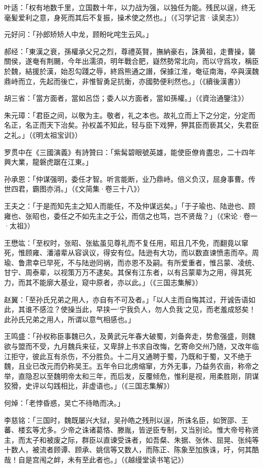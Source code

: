 叶适：「权有地数千里，立国数十年，以力战为强，以独任为能。残民以逞，终无毫髪爱利之意，身死而其后不复振，操术使之然也。」（《习学记言·读吴志》）

元好问：「孙郎矫矫人中龙，顾盼叱咤生云风。」

郝经：「東漢之衰，孫權承父兄之烈，尊禮英賢，撫納豪右，誅黄祖，走曹操，襲關侯，遂奄有荆颺，今年出濡須，明年戰合肥，嶷然勢常北向，而以守爲攻，稱臣於魏，結援於漢，始忍勾踐之辱，終爲熊通之譖，保據江淮，奄征南海，卒與漢魏鼎峙而立，先起而後亡，非惟智勇足抗衡，亦國勢便利然也。」（《續後漢書》）

胡三省：「當方面者，當如呂岱；委人以方面者，當如孫權。」（《資治通鑒注》）

朱元璋：「君臣之间，以敬为主。敬者，礼之本也。故礼立而上下之分定，分定而名正，名正而天下治矣。孙权盖不知此，轻与臣下戏狎，狎其臣而亵其父，失君臣之礼。」（《明太祖宝训》）

罗贯中在《三國演義》有詩贊曰：「紫髯碧眼號英雄，能使臣僚肯盡忠，二十四年興大業，龍磐虎踞在江東。」

孙承恩：「仲谋强明，委任才智。听言能断，业乃鼎峙。倍义负汉，屈身事曹。传世四君，霸图亦消。」（《文简集·卷三十八》）

王夫之：「于是而知先主之知人而能任，不及仲谋远矣。」「于子瑜也、陆逊也、顾雍也、张昭也，委任之不如先主之于公，而信之也笃，岂不贤哉？」（《宋论·卷一·太祖》）

王懋竑：「至权时，张昭、张紘虽见尊礼而不复任用，昭且几不免，而翻竟以窜死，惟顾雍、潘濬辈从容讽议，得安有位。陆逊有大功，而以数直谏愤恚而卒。周瑜、鲁肃幸已早死，不与陆逊同祸，而亦恩不及嗣。有所爱重者，惟吕蒙、凌统、甘宁、周泰辈，以视策万万不逮矣。其保有江东者，以有吕蒙辈为之用，得其死力，而其不能廓大基业，窥中原者，亦以此。」（《三国志集解》）

赵翼：「至孙氏兄弟之用人，亦自有不可及者。」「以人主而自悔其过，开诚告语如此，其谁不感泣？使操当此，早挟一‘宁我负人，勿人负我’之见，而老羞成怒矣！此孙氏兄弟之用人，所谓以意气相感也。」

王鸣盛：「孙权称臣事魏已久，及黄武元年春大破蜀，刘备奔走，势愈强盛，则魏欲与盟而不受，九月魏兵来征，又卑辞上书求自改悔，乞寄命交州乃随，又改年临江拒守，彼此互有杀伤，不分胜负。十二月又通聘于蜀，乃既和于蜀，又不绝于魏，且业已改元而仍称吴王。五年令曰北虏缩窜，方外无事，乃益务农亩，称帝之举，直隐忍以至魏明帝太和三年，而后发，反覆倾危，惟利是视，用柔胜刚，阴谋狡猾，史评以勾践相比，非虚语也。」（《三国志集解》）

何焯：「老悖昏惑，吴亡不待皓而决。」

李慈铭：「三国时，魏既屡兴大狱，吴孙皓之残刑以逞，所诛名臣，如贺邵、王蕃、楼玄等尤多。少帝之诛诸葛恪、滕胤，皆逆臣专制，又当别论。惟大帝号称贤主，而太子和被废之际，群臣以直谏受诛者，如吾粲、朱据、张休、屈晃、张纯等十数人，被流者顾谭、顾承、姚信等又数人，而陈正、陈象至加族诛，吁，何其酷哉！自是宫闱之衅，未有至此者也。」（《越缦堂读书笔记》）

